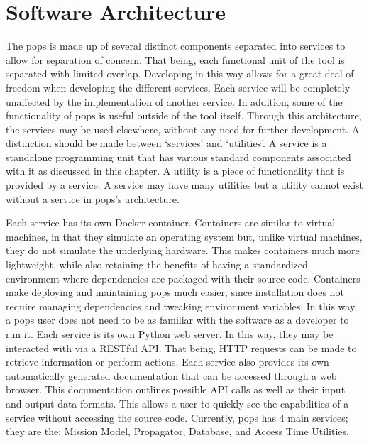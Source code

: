 \glsresetall{} 

\chapter{Software Architecture}\label{chap:architecture}


The \gls{pops} is made up of several distinct components separated into
services to allow for separation of concern. That being, each functional unit
of the tool is separated with limited overlap. Developing in this way allows
for a great deal of freedom when developing the different services. Each
service will be completely unaffected by the implementation of another service.
In addition, some of the functionality of \gls{pops} is useful outside of the
tool itself.  Through this architecture, the services may be used elsewhere,
without any need for further development. A distinction should be made between
`services' and `utilities'.  A service is a standalone programming unit that
has various standard components associated with it as discussed in this
chapter. A utility is a piece of functionality that is provided by a service.
A service may have many utilities but a utility cannot exist without a service
in \gls{pops}'s architecture.

Each service has its own Docker container. Containers are similar to virtual
machines, in that they simulate an operating system but, unlike virtual
machines, they do not simulate the underlying hardware. This makes containers
much more lightweight, while also retaining the benefits of having a
standardized environment where dependencies are packaged with their source
code. Containers make deploying and maintaining \gls{pops} much easier, since
installation does not require managing dependencies and tweaking environment
variables. In this way, a \gls{pops} user does not need to be as familiar with
the software as a developer to run it.  Each service is its own Python web
server. In this way, they may be interacted with via a RESTful API. That being,
HTTP requests can be made to retrieve information or perform actions. Each
service also provides its own automatically generated documentation that can be
accessed through a web browser. This documentation outlines possible API calls
as well as their input and output data formats.  This allows a user to quickly
see the capabilities of a service without accessing the source code. Currently,
\gls{pops} has 4 main services; they are the: Mission Model, Propagator,
Database, and Access Time Utilities.

